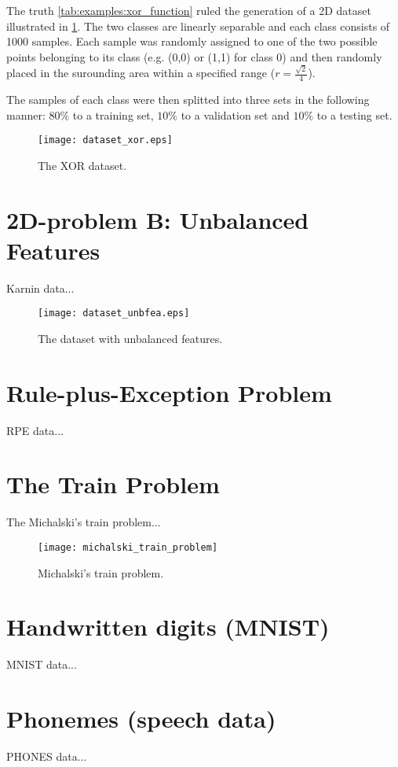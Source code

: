 The truth \cref{tab:examples:xor_function} ruled the generation of a 2D dataset illustrated in \cref{fig:examples:dataset_xor}. The two classes are linearly separable and each class consists of 1000 samples. Each sample was randomly assigned to one of the two possible points belonging to its class (e.g. (0,0) or (1,1) for class 0) and then randomly placed in the surounding area within a specified range ($ r = \frac{\sqrt{2}}{4} $).

The samples of each class were then splitted into three sets in the following manner: $ 80\% $ to a training set, $ 10\% $ to a validation set and $ 10\% $ to a testing set.

\begin{figure}[H]
\centering
\texttt{[image: dataset\_xor.eps]}
\caption{The XOR dataset.}
\label{fig:examples:dataset_xor}
\end{figure}

\section{2D-problem B: Unbalanced Features} \label{sec:dataset_unbfea}
Karnin data...

\begin{figure}[H]
\centering
\texttt{[image: dataset\_unbfea.eps]}
\caption{The dataset with unbalanced features.}
\label{fig:examples:dataset_unbfea}
\end{figure}

\section{Rule-plus-Exception Problem} \label{sec:dataset_rpe}
RPE data...

\section{The Train Problem} \label{sec:dataset_train}
The Michalski's train problem...

\begin{figure}[H]
\centering
\texttt{[image: michalski\_train\_problem]}
\caption{Michalski's train problem.}
\label{fig:examples:dataset_train}
\end{figure}

\section{Handwritten digits (MNIST)} \label{sec:dataset_mnist}
MNIST data... \citep{online:mnist}

\section{Phonemes (speech data)} \label{sec:dataset_phonemes}
PHONES data...
